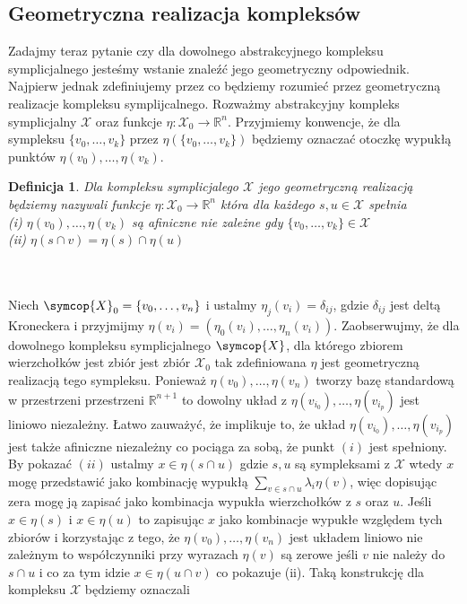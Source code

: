\documentclass[12pt,a4paper]{article}
\newcommand{\symcom}[1]{\mathcal{#1}}
\newcommand{\fun}[3]{#1:#2 \rightarrow #3}
\newcommand{\Rn}[0]{\mathbb{R}^n}
\newcommand{\set}[1]{ \{#1\}}
\newtheorem{definition}{Definicja}[section]
\begin{document}
\subsection{Geometryczna realizacja kompleksów}
Zadajmy teraz pytanie czy dla dowolnego abstrakcyjnego kompleksu symplicjalnego jesteśmy wstanie znaleźć jego geometryczny odpowiednik. Najpierw jednak zdefiniujemy przez co będziemy rozumieć przez geometryczną realizacje kompleksu symplijcalnego. Rozważmy abstrakcyjny kompleks symplicjalny $\symcom X$ oraz funkcje $\fun{\eta}{\symcom{X}_0}{\Rn}$. Przyjmiemy konwencje, że dla sympleksu $\set{v_0,\ldots,v_k}$ przez $\eta(\set{v_0,\ldots,v_k})$ będziemy oznaczać otoczkę wypukłą punktów $\eta(v_0),\ldots,\eta(v_k)$.
\begin{definition}
Dla kompleksu symplicjalego $\symcom{X}$ jego geometryczną realizacją będziemy nazywali funkcje $\fun{\eta}{\symcom{X}_0}{\Rn}$ która dla każdego $s,u\in\symcom{X}$ spełnia 
\\(i) $\eta(v_0),\ldots,\eta(v_k)$ są afiniczne nie zależne gdy $\set{v_0,\ldots,v_k}\in\symcom{X}$
\\(ii) $\eta(s\cap v) = \eta(s)\cap\eta(u)$
 \end{definition}
\\
[Pokazać, że spełnia to załorzenia abstrakcyjnego kompleksu symplicjalnego ]
\\Niech $\symcop{X}_0=\set{v_0,\ldots,v_n}$ i ustalmy $\eta_j(v_i) = \delta_{ij} $, gdzie  $\delta_{ij}$ jest deltą Kroneckera i przyjmijmy $\eta(v_i) =(\eta_0(v_i),\ldots ,\eta_n(v_i))$. Zaobserwujmy, że dla dowolnego kompleksu symplicjalnego $\symcop{X}$, dla którego zbiorem wierzchołków jest zbiór jest zbiór $\symcom{X}_0$ tak zdefiniowana $\eta$ jest geometryczną realizacją tego sympleksu. Ponieważ $\eta(v_0),\ldots,\eta(v_n)$ tworzy bazę standardową w przestrzeni przestrzeni $\mathbb{R}^{n+1}$ to dowolny układ z $\eta(v_{i_0}),\ldots,\eta(v_{i_p})$ jest liniowo niezależny. Łatwo zauważyć, że implikuje to, że układ $\eta(v_{i_0}),\ldots,\eta(v_{i_p})$ jest także afiniczne niezależny co pociąga za sobą, że punkt $(i)$ jest spełniony. By pokazać $(ii)$ ustalmy $x\in\eta({s\cap u})$ gdzie $s,u$ są sympleksami z $\symcom{X}$ wtedy $x$ mogę przedstawić jako kombinację wypukłą $\sum_{v\in s\cap u}\lambda_i\eta(v)$, więc dopisując zera mogę ją zapisać jako kombinacja wypukła wierzchołków z $s$ oraz $u$. Jeśli $x\in\eta(s)$ i $x\in\eta(u)$ to zapisując $x$ jako kombinacje wypukłe względem tych zbiorów i korzystając z tego, że  $\eta(v_0),\ldots,\eta(v_n)$ jest układem liniowo nie zależnym to współczynniki przy wyrazach $\eta(v)$ są zerowe jeśli $v$ nie należy do $s\cap u  $ i co za tym idzie $x\in\eta(u\cap v)$ co pokazuje (ii). Taką konstrukcję dla kompleksu $\symcom{X}$ będziemy oznaczali  
\end{document}
